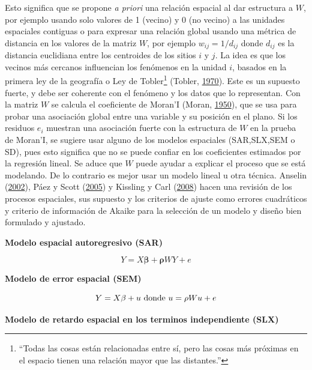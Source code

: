 \documentclass[12pt,a4paper,openany]{book}
\let\rmarkdownfootnote\footnote%
\def\footnote{\protect\rmarkdownfootnote}
\theoremstyle{definition}
\theoremstyle{definition}
\theoremstyle{definition}
\theoremstyle{remark}
\begin{document}
Esto significa que se propone \emph{a priori} una relación espacial al
dar estructura a \(W\), por ejemplo usando solo valores de 1 (vecino) y
0 (no vecino) a las unidades espaciales contiguas o para expresar una
relación global usando una métrica de distancia en los valores de la
matriz \(W\), por ejemplo \(w_{ij}= 1/d_{ij}\) donde \(d_{ij}\) es la
distancia euclidiana entre los centroides de los sitios \(i\) y \(j\).
La idea es que los vecinos más cercanos influencian los fenómenos en la
unidad \(i\), basados en la primera ley de la geografía o Ley de
Tobler\footnote{``Todas las cosas están relacionadas entre sí, pero las
  cosas más próximas en el espacio tienen una relación mayor que las
  distantes.''} (Tobler,
\protect\hyperlink{ref-tobler1970computer}{1970}). Este es un supuesto
fuerte, y debe ser coherente con el fenómeno y los datos que lo
representan. Con la matriz \(W\) se calcula el coeficiente de Moran'I
(Moran, \protect\hyperlink{ref-moran1950notes}{1950}), que se usa para
probar una asociación global entre una variable y su posición en el
plano. Si los residuos \(e_i\) muestran una asociación fuerte con la
estructura de \(W\) en la prueba de Moran'I, se sugiere usar alguno de
los modelos espaciales (SAR,SLX,SEM o SD), pues esto significa que no se
puede confiar en los coeficientes estimados por la regresión lineal. Se
aduce que \(W\) puede ayudar a explicar el proceso que se está
modelando. De lo contrario es mejor usar un modelo lineal u otra
técnica. Anselin (\protect\hyperlink{ref-anselin_under_2002}{2002}),
Páez y Scott (\protect\hyperlink{ref-paez_spatial_2005}{2005}) y
Kissling y Carl (\protect\hyperlink{ref-kissling_spatial_2008}{2008})
hacen una revisión de los procesos espaciales, sus supuesto y los
criterios de ajuste como errores cuadráticos y criterio de información
de Akaike para la selección de un modelo y diseño bien formulado y
ajustado.

\textbf{Modelo espacial autoregresivo (SAR)}

\begin{equation}
Y=X\mathbf{\beta}+\mathbf{\rho}WY+e
\label{eq:sar}
\end{equation}

\textbf{Modelo de error espacial (SEM)}

\begin{equation}
Y=X\mathbf{\beta}+u \textrm{ donde } \\
u=\mathbf{\rho}Wu+e
\label{eq:sem}
\end{equation}

\textbf{Modelo de retardo espacial en los terminos independiente (SLX)}
\end{document}

